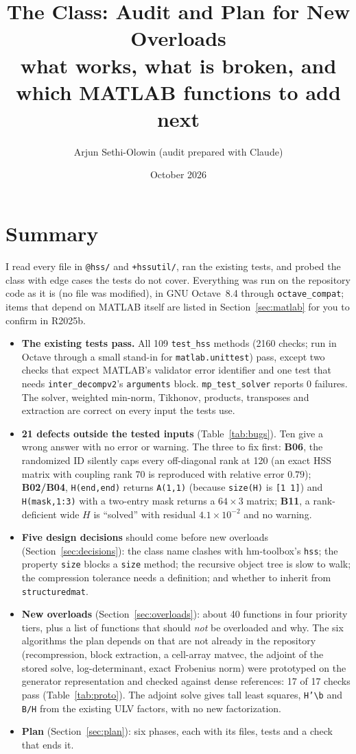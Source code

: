 \documentclass[11pt]{article}
\title{The \code{@hss} Class: Audit and Plan for New Overloads\\[2pt]
\large what works, what is broken, and which MATLAB functions to add next}
\author{Arjun Sethi-Olowin (audit prepared with Claude)}
\date{October 2026}
\newcommand{\code}[1]{\texttt{#1}}
\begin{document}
\maketitle

\section{Summary}
I read every file in \code{@hss/} and \code{+hssutil/}, ran the existing tests, and probed the class with
edge cases the tests do not cover. Everything was run on the repository code as it is (no file was modified),
in GNU Octave~8.4 through \code{octave\_compat}; items that depend on MATLAB itself are listed in
Section~\ref{sec:matlab} for you to confirm in R2025b.

\begin{itemize}
\item \textbf{The existing tests pass.} All 109 \code{test\_hss} methods (2160 checks; run in Octave through a small
stand-in for \code{matlab.unittest}) pass, except two checks that expect MATLAB's validator error identifier and
one test that needs \code{inter\_decompv2}'s \code{arguments} block. \code{mp\_test\_solver} reports 0 failures.
The solver, weighted min-norm, Tikhonov, products, transposes and extraction are correct on every input the
tests use.
\item \textbf{21 defects outside the tested inputs} (Table~\ref{tab:bugs}). Ten give a wrong answer with no
error or warning. The three to fix first:
\textbf{B06}, the randomized ID silently caps every off-diagonal rank at 120 (an exact HSS matrix with coupling
rank 70 is reproduced with relative error $0.79$);
\textbf{B02/B04}, \code{H(end,end)} returns \code{A(1,1)} (because \code{size(H)} is \code{[1 1]}) and
\code{H(mask,1:3)} with a two-entry mask returns a $64\times3$ matrix;
\textbf{B11}, a rank-deficient wide $H$ is ``solved'' with residual $4.1\times10^{-2}$ and no warning.
\item \textbf{Five design decisions} should come before new overloads (Section~\ref{sec:decisions}): the class
name clashes with hm-toolbox's \code{hss}; the property \code{size} blocks a \code{size} method; the recursive
object tree is slow to walk; the compression tolerance needs a definition; and whether to inherit from
\code{structuredmat}.
\item \textbf{New overloads} (Section~\ref{sec:overloads}): about 40 functions in four priority tiers, plus a list of
functions that should \emph{not} be overloaded and why. The six algorithms the plan depends on that are not
already in the repository (recompression, block extraction, a cell-array matvec, the adjoint of the stored
solve, log-determinant, exact Frobenius norm) were prototyped on the generator representation and checked
against dense references: 17 of 17 checks pass (Table~\ref{tab:proto}). The adjoint solve gives tall least
squares, \code{H'\textbackslash b} and \code{B/H} from the existing ULV factors, with no new factorization.
\item \textbf{Plan} (Section~\ref{sec:plan}): six phases, each with its files, tests and a check that ends it.
\end{itemize}
\end{document}
